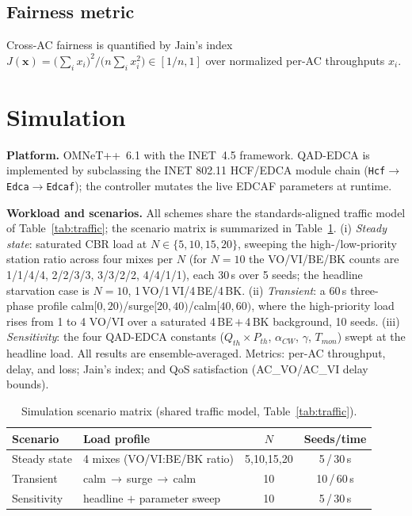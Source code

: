 \documentclass[conference]{IEEEtran}
\newcommand{\AC}[1]{AC\_#1}
\begin{document}
\subsection{Fairness metric}
Cross-AC fairness is quantified by Jain's index \cite{jain}
$J(\mathbf{x})=\big(\sum_i x_i\big)^2/\big(n\sum_i x_i^2\big)\in[1/n,1]$
over normalized per-AC throughputs $x_i$.

\section{Simulation}\label{sec:sim}
\textbf{Platform.} OMNeT++~6.1 with the INET~4.5 framework. QAD-EDCA is
implemented by subclassing the INET 802.11 HCF/EDCA module chain
(\texttt{Hcf}$\rightarrow$\texttt{Edca}$\rightarrow$\texttt{Edcaf}); the
controller mutates the live EDCAF parameters at runtime.

\textbf{Workload and scenarios.} All schemes share the standards-aligned
traffic model of Table~\ref{tab:traffic}; the scenario matrix is summarized in
Table~\ref{tab:scenarios}. (i) \emph{Steady state}: saturated CBR load at
$N\in\{5,10,15,20\}$, sweeping the high-/low-priority station ratio across four
mixes per $N$ (for $N{=}10$ the VO/VI/BE/BK counts are 1/1/4/4, 2/2/3/3,
3/3/2/2, 4/4/1/1), each 30\,s over 5 seeds; the headline starvation case is
$N{=}10$, 1\,VO/1\,VI/4\,BE/4\,BK. (ii) \emph{Transient}: a 60\,s three-phase
profile calm$[0,20)$/surge$[20,40)$/calm$[40,60)$, where the high-priority load
rises from 1 to 4 VO/VI over a saturated 4\,BE\,$+$\,4\,BK background, 10 seeds.
(iii) \emph{Sensitivity}: the four QAD-EDCA constants
($Q_{th}\!\times\!P_{th}$, $\alpha_{CW}$, $\gamma$, $T_{mon}$) swept at the
headline load. All results are ensemble-averaged. Metrics: per-AC throughput,
delay, and loss; Jain's index; and QoS satisfaction (\AC{VO}/\AC{VI} delay
bounds).

\begin{table}[t]
\centering
\caption{Simulation scenario matrix (shared traffic model, Table~\ref{tab:traffic}).}
\label{tab:scenarios}
\begin{tabular}{@{}llcc@{}}
\toprule
Scenario & Load profile & $N$ & Seeds/time\\
\midrule
Steady state & 4 mixes (VO/VI:BE/BK ratio)    & 5,10,15,20 & 5\,/\,30\,s\\
Transient    & calm\,$\to$\,surge\,$\to$\,calm & 10         & 10\,/\,60\,s\\
Sensitivity  & headline $+$ parameter sweep    & 10         & 5\,/\,30\,s\\
\bottomrule
\end{tabular}
\end{table}
\end{document}
